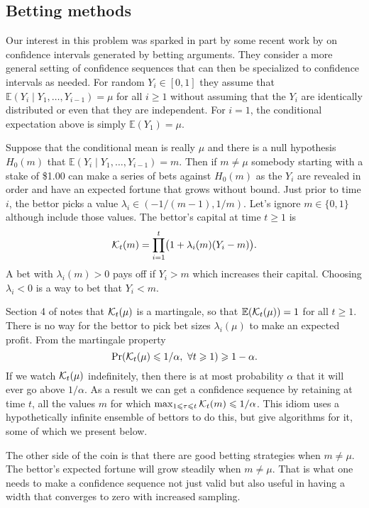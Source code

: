 \documentclass{article}
\renewcommand{\le}{\leqslant}
\renewcommand{\ge}{\geqslant}
\newcommand{\e}{\mathbb{E}}
\newcommand{\giv}{\!\mid\!} %
\begin{document}
\subsection{Betting methods}

Our interest in this problem was sparked in part by some recent
work by \cite{WauRam24a} on confidence intervals generated
by betting arguments.  They consider a more general setting
of confidence sequences that can then be specialized to
confidence intervals as needed.  
For random $Y_i\in[0,1]$ they assume
that $\e(Y_i\giv Y_1,\dots,Y_{i-1})=\mu$ for all $i\ge1$ 
without assuming
that the $Y_i$ are identically distributed or even that
they are independent. For $i=1$, the conditional expectation 
above is simply $\e(Y_1)=\mu$.

Suppose that the conditional mean is really $\mu$ and 
there is a null hypothesis $H_0(m)$ that
$\e(Y_i\giv Y_1,\dots, Y_{i-1})=m$. Then if $m\ne\mu$
somebody starting with a stake of \$1.00 can
make a series of bets against $H_0(m)$
as the $Y_i$ are revealed in order
and have an expected fortune that grows without bound.
Just prior to time $i$, the bettor picks a value
$\lambda_i\in(-1/(m-1),1/m)$. Let's ignore $m\in\{0,1\}$
although \cite{WauRam24a} include those values. The bettor's
capital at time $t\ge1$ is
$$
\mathcal{K}_t(m)= \prod_{i=1}^t\bigl(1+\lambda_i(m)(Y_i-m)\bigr).
$$
A bet with $\lambda_i(m)>0$ pays off if $Y_i>m$ which
increases their capital. Choosing $\lambda_i<0$ is a 
way to bet that $Y_i<m$.

Section 4 of \cite{WauRam24a} notes that $\mathcal{K}_t(\mu)$ is
a martingale, so that $\e(\ck_t(\mu))=1$ for all $t\ge1$.
There is no way for the bettor to pick bet sizes $\lambda_i(\mu)$
to make an expected profit.    From the martingale
property
$$
\Pr( \ck_t(\mu)\le 1/\alpha,\ \forall t\ge1)\ge1-\alpha.
$$
If we watch $\mathcal{K}_t(\mu)$ indefinitely, then
there is at most probability $\alpha$ that it will
ever go above $1/\alpha$.  As a result we can get
a confidence sequence by retaining at time $t$,
all the values $m$ for 
which $\max_{1\le\tau\le t}\ck_t(m)\le1/\alpha$.
This idiom uses a hypothetically infinite ensemble of 
bettors to do this, but \cite{WauRam24a} give
algorithms for it, some of which we present below.

The other side of the coin is that there are good betting
strategies when $m\ne\mu$.  The bettor's expected fortune
will grow steadily when $m\ne\mu$. That is what one needs
to make a confidence sequence not just valid but also useful
in having a width that converges to zero with increased sampling.
\end{document}
